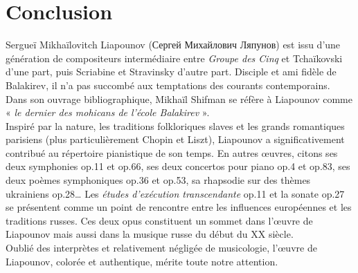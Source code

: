 
\chapter{Conclusion}

Sergueï Mikhaïlovitch Liapounov (\foreignlanguage{russian}{Сергей Михайлович Ляпунов}) est issu d'une génération de compositeurs intermédiaire entre \emph{Groupe des Cinq} et Tchaïkovski d'une part, puis Scriabine et Stravinsky d'autre part. Disciple et ami fidèle de Balakirev, il n'a pas succombé aux temptations des courants contemporains. Dans son ouvrage bibliographique\cite{2}, Mikhaïl Shifman se réfère à Liapounov comme « \emph{le dernier des mohicans de l'école Balakirev} ».\\

Inspiré par la nature, les traditions folkloriques slaves et les grands romantiques parisiens (plus particulièrement Chopin et Liszt), Liapounov a significativement contribué au répertoire pianistique de son temps. En autres œuvres, citons ses deux symphonies op.11 et op.66, ses deux concertos pour piano op.4 et op.83, ses deux poèmes symphoniques op.36 et op.53, sa rhapsodie sur des thèmes ukrainiens op.28\dots{} Les \emph{études d'exécution transcendante} op.11 et la sonate op.27 se présentent comme un point de rencontre entre les influences européennes et les traditions russes. Ces deux opus constituent un sommet dans l'œuvre de Liapounov mais aussi dans la musique russe du début du XX\ieme{} siècle.\\

Oublié des interprètes et relativement négligée de musicologie, l'œuvre de Liapounov, colorée et authentique, mérite toute notre attention.

